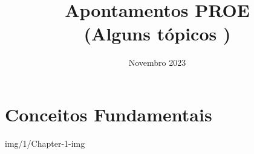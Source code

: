 \documentclass{kons-5}
\title{%
    Apontamentos PROE \\ 
    \large (Alguns tópicos \href{https://github.com/Kons-5}{\large \faGithub})
}
\date{Novembro 2023}
\begin{document}
    \maketitle

    

    \customtoc
    
    \pagestyle{custom}
    
    \chapter{Conceitos Fundamentais}{img/1/Chapter-1-img}
        
        
        
        



    \clearpage
     \nocite{*}
    
\end{document}
